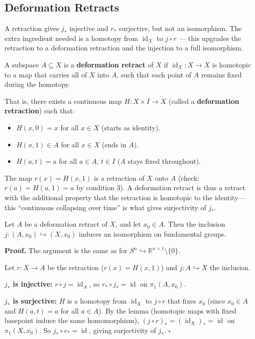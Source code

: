 \documentclass[11pt]{report}
\renewenvironment{proof}[1][Proof]{\noindent\textbf{#1.} }{\hfill$\square$\par\vspace{5pt}}
\begin{document}
\subsection{Deformation Retracts}

A retraction gives $j_*$ injective and $r_*$ surjective, but not an isomorphism. The extra ingredient needed is a homotopy from $\operatorname{id}_X$ to $j \circ r$ --- this upgrades the retraction to a deformation retraction and the injection to a full isomorphism.

\begin{defbox}
A subspace $A \subseteq X$ is a \textbf{deformation retract} of $X$ if $\operatorname{id}_X: X \to X$ is homotopic to a map that carries all of $X$ into $A$, such that each point of $A$ remains fixed during the homotopy.

That is, there exists a continuous map $H: X \times I \to X$ (called a \textbf{deformation retraction}) such that:
\begin{itemize}[nosep]
    \item $H(x, 0) = x$ for all $x \in X$ (starts as identity).
    \item $H(x, 1) \in A$ for all $x \in X$ (ends in $A$).
    \item $H(a, t) = a$ for all $a \in A$, $t \in I$ ($A$ stays fixed throughout).
\end{itemize}
\end{defbox}

\begin{rembox}
The map $r(x) = H(x, 1)$ is a retraction of $X$ onto $A$ (check: $r(a) = H(a, 1) = a$ by condition 3). A deformation retract is thus a retract with the additional property that the retraction is homotopic to the identity---this ``continuous collapsing over time'' is what gives surjectivity of $j_*$.
\end{rembox}

\begin{thmbox}
Let $A$ be a deformation retract of $X$, and let $x_0 \in A$. Then the inclusion $j: (A, x_0) \hookrightarrow (X, x_0)$ induces an isomorphism on fundamental groups.
\end{thmbox}

\begin{proof}
The argument is the same as for $S^n \hookrightarrow \mathbb{R}^{n+1} \setminus \{0\}$.

Let $r: X \to A$ be the retraction ($r(x) = H(x,1)$) and $j: A \hookrightarrow X$ the inclusion.

\textbf{$j_*$ is injective:} $r \circ j = \operatorname{id}_A$, so $r_* \circ j_* = \operatorname{id}$ on $\pi_1(A, x_0)$.

\textbf{$j_*$ is surjective:} $H$ is a homotopy from $\operatorname{id}_X$ to $j \circ r$ that fixes $x_0$ (since $x_0 \in A$ and $H(a, t) = a$ for all $a \in A$). By the lemma (homotopic maps with fixed basepoint induce the same homomorphism), $(j \circ r)_* = (\operatorname{id}_X)_* = \operatorname{id}$ on $\pi_1(X, x_0)$. So $j_* \circ r_* = \operatorname{id}$, giving surjectivity of $j_*$.
\end{proof}
\end{document}
